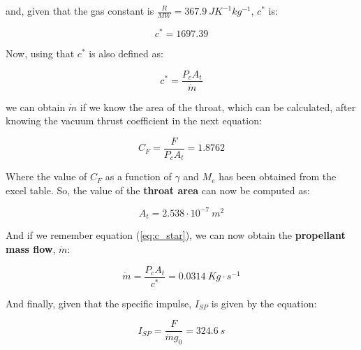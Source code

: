 and, given that the gas constant is $\frac{R}{MW} = 367.9 ~ JK^{-1}kg^{-1}$, $c^*$ is:

\begin{equation}
	c^* = 1697.39
\end{equation}

Now, using that $c^*$ is also defined as:

\begin{equation}
	c^* = \frac{P_c A_t}{\dot{m}}
	\label{eq:c_star}
\end{equation}

we can obtain $\dot{m}$ if we know the area of the throat, which can be calculated,
after knowing the vacuum thrust coefficient in the next equation:

\begin{equation}
	C_F = \frac{F}{P_c A_t} = 1.8762
\end{equation}

Where the value of $C_F$ as a function of $\gamma$ and $M_e$ has been obtained
from the excel table. So, the value of the \textbf{throat area} can now be computed as:

\begin{equation}
	\boxed{A_t = 2.538·10^{-7} ~ m^2}
\end{equation}

And if we remember equation (\ref{eq:c_star}), we can now obtain the \textbf{propellant
mass flow}, $\dot{m}$:

\begin{equation}
	\boxed{\dot{m} = \frac{P_c A_t}{c^*} = 0.0314 ~ Kg·s^{-1}}
\end{equation}

And finally, given that the specific impulse, $I_{SP}$ is given by the equation:

\begin{equation}
	\boxed{I_{SP} = \frac{F}{\dot{m}g_0} = 324.6 ~ s}
\end{equation}
